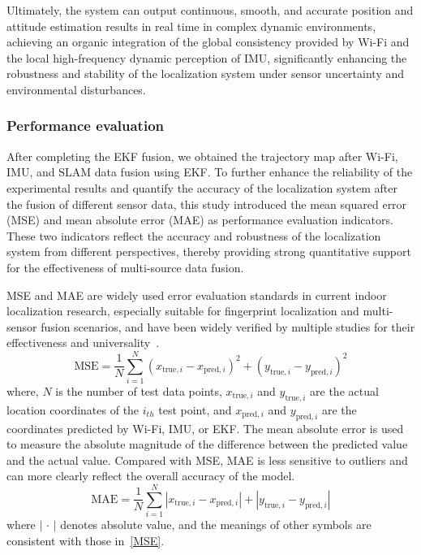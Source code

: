 \documentclass[12pt,a4paper]{article}
\numberwithin{equation}{section}
\begin{document}
Ultimately, the system can output continuous, smooth, and accurate position and
attitude estimation results in real time in complex dynamic environments,
achieving an organic integration of the global consistency provided by Wi-Fi and
the local high-frequency dynamic perception of IMU, significantly enhancing the
robustness and stability of the localization system under sensor uncertainty and
environmental disturbances.

\subsubsection{Performance evaluation}
After completing the EKF fusion, we obtained the trajectory map after Wi-Fi,
IMU, and SLAM data fusion using EKF. To further enhance the reliability of the
experimental results and quantify the accuracy of the localization system after
the fusion of different sensor data, this study introduced the mean squared
error (MSE) and mean absolute error (MAE) as performance evaluation
indicators. These two indicators reflect the accuracy and robustness of the
localization system from different perspectives, thereby providing strong
quantitative support for the effectiveness of multi-source data fusion.

MSE and MAE are widely used error evaluation standards in current indoor
localization research, especially suitable for fingerprint localization and
multi-sensor fusion scenarios, and have been widely verified by multiple studies
for their effectiveness and universality~\cite{sun2019fusion, he2015wi}.
\begin{equation}
  \text{MSE} = \frac{1}{N} \sum_{i=1}^{N} \left( x_{\text{true}, i} - x_{\text{pred}, i} \right)^2 + \left( y_{\text{true}, i} - y_{\text{pred}, i} \right)^2
  \label{MSE}
\end{equation}
where, $N$ is the number of test data points, $x_{\text{true}, i}$ and
$y_{\text{true}, i}$ are the actual location coordinates of the $i_{th}$ test
point, and $x_{\text{pred}, i}$ and $y_{\text{pred}, i}$ are the coordinates
predicted by Wi-Fi, IMU, or EKF.  The mean absolute error is used to measure the
absolute magnitude of the difference between the predicted value and the actual
value. Compared with MSE, MAE is less sensitive to outliers and can more clearly
reflect the overall accuracy of the model.
\begin{equation}
  \text{MAE} = \frac{1}{N} \sum_{i=1}^{N} \left| x_{\text{true}, i} - x_{\text{pred}, i} \right| + \left| y_{\text{true}, i} - y_{\text{pred}, i} \right|
  \label{MAE}
\end{equation}
where $\left| \,\cdot\, \right|$ denotes absolute value, and the meanings of
other symbols are consistent with those in~\autoref{MSE}.
\end{document}
